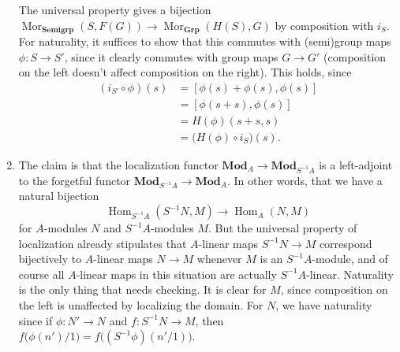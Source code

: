 \documentclass{report}
\newcommand{\cat}[1]{\mathbf{#1}} %
\DeclareMathOperator{\Mor}{Mor}
\DeclareMathOperator{\Hom}{Hom}
\begin{document}
\begin{enumerate}[label=\textbf{1.5.\Alph*.}]
	      The universal property gives a bijection
	      $\Mor_{\cat{Semigrp}}(S,F(G))\to\Mor_{\cat{Grp}}(H(S),G)$ by
	      composition with $i_S$. For naturality, it suffices to show that
	      this commutes with (semi)group maps $\phi:S\to S'$, since it clearly
	      commutes with group maps $G\to G'$ (composition on the left doesn't
	      affect composition on the right). This holds, since
	      \begin{align*}
		      (i_{S'}\circ\phi)(s)
		       & = [\phi(s)+\phi(s),\phi(s)]        \\
		       & = [\phi(s+s),\phi(s)]              \\
		       & = H(\phi)(s+s,s)                   \\
		       & = \bigl(H(\phi)\circ i_S\bigr)(s).
	      \end{align*}

	\item The claim is that the localization functor
	      $\cat{Mod}_A\to\cat{Mod}_{S^{-1}A}$ is a left-adjoint to the
	      forgetful functor $\cat{Mod}_{S^{-1}A}\to\cat{Mod}_A$. In other
	      words, that we have a natural bijection
	      \begin{equation*}
		      \Hom_{S^{-1}A}(S^{-1}N,M) \to \Hom_A(N,M)
	      \end{equation*}
	      for $A$-modules $N$ and $S^{-1}A$-modules $M$. But the universal
	      property of localization already stipulates that $A$-linear maps
	      $S^{-1}N\to M$ correspond bijectively to $A$-linear maps $N\to M$
	      whenever $M$ is an $S^{-1}A$-module, and of course all $A$-linear
	      maps in this situation are actually $S^{-1}A$-linear. Naturality is
	      the only thing that needs checking. It is clear for $M$, since
	      composition on the left is unaffected by localizing the domain. For
	      $N$, we have naturality since if $\phi:N'\to N$ and $f:S^{-1}N\to M$,
	      then $f\bigl(\phi(n')/1\bigr) = f\bigl((S^{-1}\phi)(n'/1)\bigr)$.
\end{enumerate}
\end{document}
